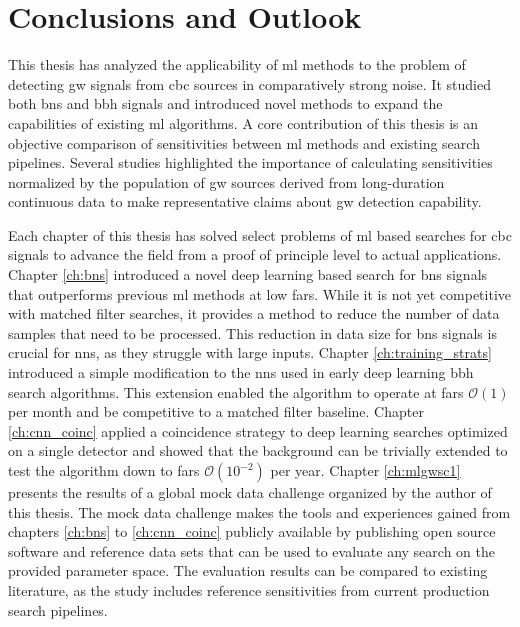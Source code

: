 \chapter{Conclusions and Outlook}\label{ch:conclusions}
This thesis has analyzed the applicability of \acrshort{ml} methods to the problem of detecting \acrshort{gw} signals from \acrshort{cbc} sources in comparatively strong noise. It studied both \acrshort{bns} and \acrshort{bbh} signals and introduced novel methods to expand the capabilities of existing \acrshort{ml} algorithms. A core contribution of this thesis is an objective comparison of sensitivities between \acrshort{ml} methods and existing search pipelines. Several studies highlighted the importance of calculating sensitivities normalized by the population of \acrshort{gw} sources derived from long-duration continuous data to make representative claims about \acrshort{gw} detection capability.

Each chapter of this thesis has solved select problems of \acrshort{ml} based searches for \acrshort{cbc} signals to advance the field from a proof of principle level to actual applications. Chapter \ref{ch:bns} introduced a novel deep learning based search for \acrshort{bns} signals that outperforms previous \acrshort{ml} methods at low \acrshort{far}s. While it is not yet competitive with matched filter searches, it provides a method to reduce the number of data samples that need to be processed. This reduction in data size for \acrshort{bns} signals is crucial for \acrshort{nn}s, as they struggle with large inputs. Chapter \ref{ch:training_strats} introduced a simple modification to the \acrshort{nn}s used in early deep learning \acrshort{bbh} search algorithms. This extension enabled the algorithm to operate at \acrshort{far}s $\mathcal{O}(1)$ per month and be competitive to a matched filter baseline. Chapter \ref{ch:cnn_coinc} applied a coincidence strategy to deep learning searches optimized on a single detector and showed that the background can be trivially extended to test the algorithm down to \acrshort{far}s $\mathcal{O}(10^{-2})$ per year. Chapter \ref{ch:mlgwsc1} presents the results of a global mock data challenge organized by the author of this thesis. The mock data challenge makes the tools and experiences gained from chapters \ref{ch:bns} to \ref{ch:cnn_coinc} publicly available by publishing open source software and reference data sets that can be used to evaluate any search on the provided parameter space. The evaluation results can be compared to existing literature, as the study includes reference sensitivities from current production search pipelines.

